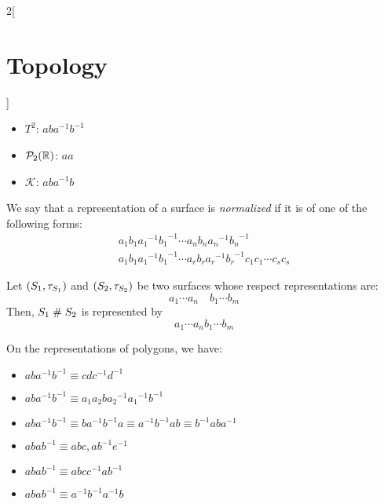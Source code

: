 \documentclass[../../../main.tex]{subfiles}
\begin{document}
\begin{multicols}{2}[\section{Topology}]
\begin{proposition}
\begin{itemize}
      \item $T^2$: $aba^{-1}b^{-1}$
      \item $\mathcal{P}_2(\mathbb{R})$: $aa$
      \item $\mathcal{K}$: $aba^{-1}b$
    \end{itemize}
  \end{proposition}
  \begin{center}
    \begin{minipage}{\linewidth}
      \centering
      
    \end{minipage}
  \end{center}
  \begin{definition}
    We say that a representation of a surface is \emph{normalized} if it is of one of the following forms:
    \begin{gather*}
      a_1b_1{a_1}^{-1}{b_1}^{-1}\cdots a_nb_n{a_n}^{-1}{b_n}^{-1}\\
      a_1b_1{a_1}^{-1}{b_1}^{-1}\cdots a_rb_r{a_r}^{-1}{b_r}^{-1}c_1c_1\cdots c_sc_s
    \end{gather*}
  \end{definition}
  \begin{proposition}
    Let $(S_1,\tau_{S_1})$ and $(S_2,\tau_{S_2})$ be two surfaces whose respect representations are: $$a_1\cdots a_n\quad b_1\cdots b_m$$
    Then, $S_1\mathrel{\#} S_2$ is represented by $$a_1\cdots a_nb_1\cdots b_m$$
  \end{proposition}
  \begin{proposition}
    On the representations of polygons, we have:
    \begin{itemize}
      \item $aba^{-1}b^{-1}\equiv cdc^{-1}d^{-1}$
      \item $aba^{-1}b^{-1}\equiv a_1a_2b{a_2}^{-1}{a_1}^{-1}b^{-1}$
      \item $aba^{-1}b^{-1}\equiv ba^{-1}b^{-1}a\equiv a^{-1}b^{-1}ab\equiv b^{-1}aba^{-1}$
      \item $abab^{-1}\equiv abc, ab^{-1}e^{-1}$
      \item $abab^{-1}\equiv abcc^{-1}ab^{-1}$
      \item $abab^{-1}\equiv a^{-1}b^{-1}a^{-1}b$
    \end{itemize}
  \end{proposition}

\end{multicols}
\end{document}
